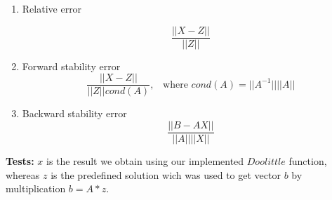 \documentclass[12pt]{article}
\begin{document}
\bigskip
\begin{enumerate}

\item Relative error

\[
\frac{\vert \vert X-Z \vert \vert}{\vert \vert Z \vert \vert}
\]

\item Forward stability error
\[
\frac{\vert \vert X-Z \vert \vert}{\vert \vert Z \vert \vert cond(A)}\textrm{,} \quad \textrm{where } cond(A)=\vert \vert A^{-1} \vert \vert \vert \vert A \vert \vert
\]

\item Backward stability error
\[
\frac{\vert \vert B-AX \vert \vert}{\vert \vert A \vert \vert \vert \vert X \vert \vert}
\]
\vskip5pt
\end{enumerate}

\textbf{Tests:}
$x$ is the result we obtain using our implemented $Doolittle$ function, whereas $z$ is the predefined solution wich was used to get vector $b$ by multiplication $b=A*z$.
\end{document}
